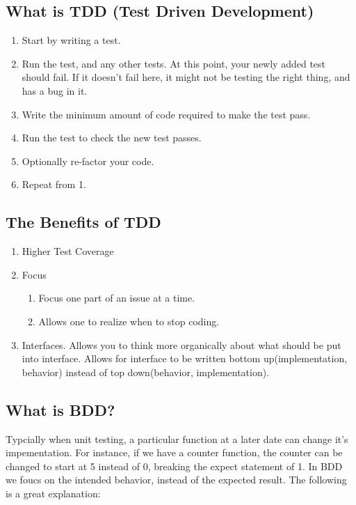 \subsection{What is TDD (Test Driven Development)}
\begin{enumerate}
  \item Start by writing a test.
  \item Run the test, and any other tests. At this point, your newly added test
  should fail. If it doesn't fail here, it might not be testing the right thing,
  and has a bug in it.
  \item Write the minimum amount of code required to make the test pass.
  \item Run the test to check the new test passes.
  \item Optionally re-factor your code.
  \item Repeat from 1.
\end{enumerate}

\subsection{ The Benefits of TDD }
\begin{enumerate}
  \item Higher Test Coverage
  \item Focus
    \begin{enumerate}
      \item Focus one part of an issue at a time.
      \item Allows one to realize when to stop coding.
    \end{enumerate}
  \item Interfaces. Allows you to think more organically about what should be
  put into interface. Allows for interface to be written bottom
  up(implementation, behavior) instead of top down(behavior, implementation).
\end{enumerate}

\subsection{ What is BDD? }
Typcially when unit testing, a particular function at a later date can change
it's impementation. For instance, if we have a counter function, the counter
can be changed to start at 5 instead of 0, breaking the expect statement of 1.
In BDD we foucs on the intended behavior, instead of the expected result. The
following is a great explanation:

